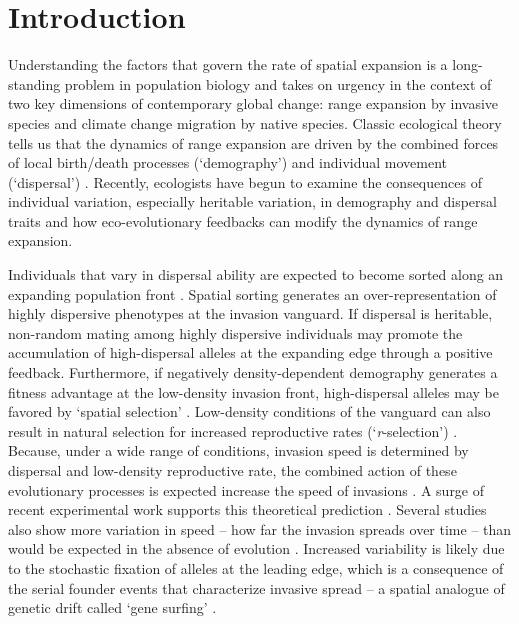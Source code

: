 \documentclass[11pt]{article}
\begin{document}
\newpage{}

\section*{Introduction}
Understanding the factors that govern the rate of spatial expansion is a long-standing problem in population biology and takes on urgency in the context of two key dimensions of contemporary global change: range expansion by invasive species and climate change migration by native species.
Classic ecological theory tells us that the dynamics of range expansion are driven by the combined forces of local birth/death processes (`demography') and individual movement (`dispersal') \citep{skellam_random_1951,okubo_diffusion_1980,kot_discrete-time_1986,kot_dispersal_1996}.
Recently, ecologists have begun to examine the consequences of individual variation, especially heritable variation, in demography and dispersal traits and how eco-evolutionary feedbacks can modify the dynamics of range expansion.

Individuals that vary in dispersal ability are expected to become sorted along an expanding population front \citep{shine_evolutionary_2011}.
Spatial sorting generates an over-representation of highly dispersive phenotypes at the invasion vanguard.
If dispersal is heritable, non-random mating among highly dispersive individuals may promote the accumulation of high-dispersal alleles at the expanding edge through a positive feedback.
Furthermore, if negatively density-dependent demography generates a fitness advantage at the low-density invasion front, high-dispersal alleles may be favored by `spatial selection' \citep{phillips_life-history_2010, perkins_evolution_2013}.
Low-density conditions of the vanguard can also result in natural selection for increased reproductive rates (`\textit{r}-selection’) \citep{phillips_life-history_2010}.
Because, under a wide range of conditions, invasion speed is determined by dispersal and low-density reproductive rate, the combined action of these evolutionary processes is expected increase the speed of invasions \citep{phillips_evolutionary_2015}. A surge of recent experimental work supports this theoretical prediction \citep{williams_rapid_2016, ochocki_rapid_2017, weiss-lehman_rapid_2017,van2018kin}.
Several studies also show more variation in speed -- how far the invasion spreads over time -- than would be expected in the absence of evolution \citep{phillips_evolutionary_2015, ochocki_rapid_2017, weiss-lehman_rapid_2017}.
Increased variability is likely due to the stochastic fixation of alleles at the leading edge, which is a consequence of the serial founder events that characterize invasive spread -- a spatial analogue of genetic drift called `gene surfing' \citep{edmonds_mutations_2004,klopfstein_fate_2006,excoffier_surfing_2008,peischl_expansion_2015,phillips_evolutionary_2015, ochocki_rapid_2017, weiss-lehman_rapid_2017}.
\end{document}
